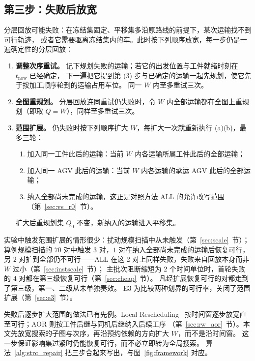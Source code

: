 \documentclass[manuscript,screen,review]{acmart}
\newcommand{\ScalePairs}{70}
\begin{document}
\subsection{第三步：失败后放宽}
\label{sec:scope_escalation}

分层回放可能失败：在冻结集固定、平移集多沿原路线的前提下，某次运输找不到可行轨迹，
或者它需要驱离冻结集内的车。此时按下列顺序放宽，每一步仍是一遍确定性的分层回放：
\begin{enumerate}[label=(\alph*),leftmargin=2em,itemsep=0.15em]
\item \textbf{调整次序重试。} 记下规划失败的运输；若它的出发位置与工件就绪时刻在 \(t_{\mathrm{now}}\) 已经确定，
下一遍把它提到第 (3) 步与已确定的运输一起先规划，使它先于按加工顺序轮到的运输占用车位。
同一 \(W\) 内至多重试三次。
\item \textbf{全图重规划。} 分层回放连同重试仍失败时，令 \(W\) 内全部运输都在全图上重规划（即取 \(Q=W\)），同样至多重试三次。
\item \textbf{范围扩展。} 仍失败时按下列顺序扩大 \(W\)，每扩大一次就重新执行 (a)(b)，最多三轮：
\begin{enumerate}[label=(\roman*),leftmargin=1.6em,itemsep=0.1em]
\item 加入同一工件此后的运输：当前 \(W\) 内各运输所属工件此后的全部运输；
\item 加入同一 AGV 此后的运输：当前 \(W\) 内各运输的承运 AGV 此后的全部运输；
\item 纳入全部尚未完成的运输，这正是对照方法 ALL 的允许改写范围（第~\ref{sec:vs_r0}~节）。
\end{enumerate}
扩大后重规划集 \(Q_0\) 不变，新纳入的运输进入平移集。
\end{enumerate}
实验中触发范围扩展的情形很少：扰动规模扫描中从未触发（第~\ref{sec:scale}~节）；
算例规模扫描的 \(\ScalePairs\) 对中触发 \(3\) 对，\(1\) 对在纳入全部尚未完成的运输后恢复可行，
另 \(2\) 对扩到全部仍不可行——ALL 在这 \(2\) 对上同样失败，失败来自回放本身而非 \(W\) 过小（第~\ref{sec:instscale}~节）；
主批次阻断缩短为 \(2\) 个时间单位时，首轮失败的 \(4\) 对都在第三级恢复可行（第~\ref{sec:cheap}~节）。
凡经扩展恢复可行的对都走到了第三级，第一、二级从未单独奏效。
E3 为比较两种划界的可行率，关闭了范围扩展（第~\ref{sec:e3}~节）。

失败后逐步扩大范围的做法已有先例。Local Rescheduling~\cite{kuster2007local}
按时间窗逐步放宽直至可行；AOR 则按工件后继与同机后继纳入后续工序
（第~\ref{sec:rw_aor}~节）。本文先放宽搜索的子图与次序，再沿预约依赖的方向扩大 \(W\)，而不是沿时间窗。
这一步保证影响集过紧时仍能恢复可行，而不必立即转为全局搜索。
算法~\ref{alg:strc_repair} 把三步合起来写出，与图~\ref{fig:framework} 对应。
\end{document}
